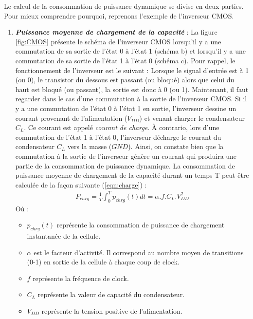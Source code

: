 \documentclass[oneside]{book}
\begin{document}
\vspace{+0.5 cm}\hspace{-0.5 cm}

Le calcul de la consommation de puissance dynamique se divise en deux parties. Pour mieux comprendre pourquoi, reprenons l'exemple de l'inverseur CMOS.

\begin{enumerate}
\vspace{-0.2 cm}\item \textbf{\textit{Puissance moyenne de chargement de la capacité}} : La figure \ref{fig:CMOS} présente le schéma de l'inverseur CMOS lorsqu'il y a une commutation de sa sortie de l'état 0 à l'état 1 (schéma b) et lorsqu'il y a une commutation de sa sortie de l'état 1 à l'état 0 (schéma c). Pour rappel, le fonctionnement de l'inverseur est le suivant : Lorsque le signal d'entrée est à 1 (ou 0), le transistor du dessous est passant (ou bloqué) alors que celui du haut est bloqué (ou passant), la sortie est donc à 0 (ou 1). Maintenant, il faut regarder dans le cas d'une commutation à la sortie de l'inverseur CMOS. Si il y a une commutation de l'état 0 à l'état 1 en sortie, l'inverseur dessine un courant provenant de l'alimentation ($V_{DD}$) et venant charger le condensateur $C_L$. Ce courant est appelé \textit{courant de charge}. À contrario, lors d'une commutation de l'état 1 à l'état 0, l'inverseur décharge le courant du condensateur $C_L$ vers la masse ($GND$). Ainsi, on constate bien que la commutation à la sortie de l'inverseur génère un courant qui produira une partie de la consommation de puissance dynamique. La consommation de puissance moyenne de chargement de la capacité durant un temps T peut être calculée de la façon suivante (\ref{eqn:charge}) :
\begin{gather}
	P_{chrg} = \frac{1}{T}\int_{0}^{T}p_{chrg}(t)dt=\alpha.f.C_{L}.V_{DD}^{2}\label{eqn:charge}
\end{gather}
Où :
\begin{itemize}
\item $p_{chrg}(t)$ représente la consommation de puissance de chargement instantanée de la cellule.
\item $\alpha$ est le facteur d'activité. Il correspond au nombre moyen de transitions (0-1) en sortie de la cellule à chaque coup de clock.
\item $f$ représente la fréquence de clock.
\item $C_L$ représente la valeur de capacité du condensateur.
\item $V_{DD}$ représente la tension positive de l'alimentation. \\
\end{itemize}



\end{enumerate}
\end{document}

